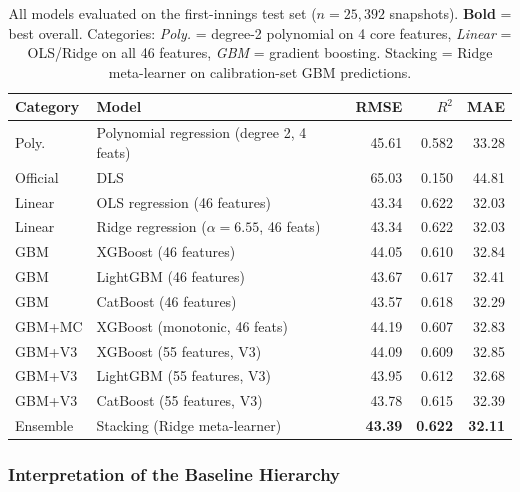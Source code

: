 \documentclass[12pt,a4paper,oneside]{report}
\begin{document}
\begin{table}[htbp]
\centering
\caption[Comprehensive model hierarchy: baselines, DLS, and ML models]{All models evaluated on the first-innings test set ($n = 25{,}392$ snapshots).  \textbf{Bold} = best overall.  Categories: \textit{Poly.} = degree-2 polynomial on 4 core features, \textit{Linear} = OLS/Ridge on all 46 features, \textit{GBM} = gradient boosting.  Stacking = Ridge meta-learner on calibration-set GBM predictions.}
\label{tab:baseline_hierarchy}
\small
\begin{tabular}{llrrr}
\toprule
\textbf{Category} & \textbf{Model} & \textbf{RMSE} & $R^2$ & \textbf{MAE} \\
\midrule
Poly.   & Polynomial regression (degree 2, 4 feats) & 45.61 & 0.582 & 33.28 \\
Official& DLS                                       & 65.03 & 0.150 & 44.81 \\
\midrule
Linear  & OLS regression (46 features)              & 43.34 & 0.622 & 32.03 \\
Linear  & Ridge regression ($\alpha=6.55$, 46 feats) & 43.34 & 0.622 & 32.03 \\
\midrule
GBM     & XGBoost (46 features)                     & 44.05 & 0.610 & 32.84 \\
GBM     & LightGBM (46 features)                    & 43.67 & 0.617 & 32.41 \\
GBM     & CatBoost (46 features)                    & 43.57 & 0.618 & 32.29 \\
GBM+MC  & XGBoost (monotonic, 46 feats)             & 44.19 & 0.607 & 32.83 \\
GBM+V3  & XGBoost (55 features, V3)                 & 44.09 & 0.609 & 32.85 \\
GBM+V3  & LightGBM (55 features, V3)                & 43.95 & 0.612 & 32.68 \\
GBM+V3  & CatBoost (55 features, V3)                & 43.78 & 0.615 & 32.39 \\
Ensemble& Stacking (Ridge meta-learner)              & \textbf{43.39} & \textbf{0.622} & \textbf{32.11} \\
\bottomrule
\end{tabular}
\end{table}

\subsubsection*{Interpretation of the Baseline Hierarchy}
\end{document}
